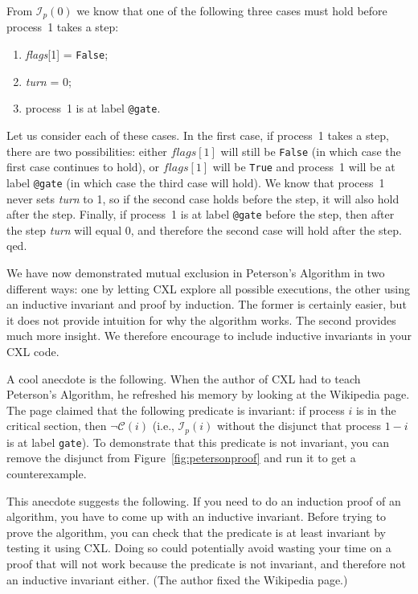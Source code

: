 \documentclass{report}
\begin{document}
From $\mathcal{I}_p(0)$ we know that one of the following three cases must hold before
process~1 takes a step:
\begin{enumerate}
\item \textit{flags}[1] = \texttt{False};
\item \textit{turn} = 0;
\item process~1 is at label \texttt{@gate}.
\end{enumerate}

Let us consider each of these cases.
In the first case, if process~1 takes a step, there are two possibilities:
either $flags[1]$ will still be \texttt{False} (in which case the first case
continues to hold), or $flags[1]$ will be \texttt{True}
and process~1 will be at label \texttt{@gate} (in which case the third case
will hold).
We know that process~1 never sets \textit{turn} to 1, so
if the second case holds before the step, it will also hold after the step.
Finally, if process~1 is at label \texttt{@gate} before the step, then after
the step \textit{turn} will equal 0, and therefore the second case will hold
after the step.  qed.

We have now demonstrated mutual exclusion in Peterson's Algorithm in two
different ways: one by letting CXL explore all possible executions, the
other using an inductive invariant and proof by induction.  The former
is certainly easier, but it does not provide intuition for why the
algorithm works.  The second provides much more insight.  We therefore
encourage to include inductive invariants in your CXL code.

A cool anecdote is the following.  When the author of CXL had to teach
Peterson's Algorithm, he refreshed his memory by looking at the Wikipedia
page.  The page claimed that the following predicate is invariant:
if process $i$ is in the critical section, then $\lnot \mathcal{C}(i)$ (i.e.,
$\mathcal{I}_p(i)$ without the disjunct that process $1-i$ is at label \texttt{gate}).
To demonstrate that this predicate is not invariant, you can remove the
disjunct from Figure~\ref{fig:petersonproof} and run it to get a
counterexample.

This anecdote suggests the following.  If you need to do an induction
proof of an algorithm, you have to come up with an inductive invariant.
Before trying to prove the algorithm, you can check that the predicate is
at least invariant by testing it using CXL.  Doing so could potentially
avoid wasting your time on a proof that will not work because the
predicate is not invariant, and therefore not an inductive invariant either.
(The author fixed the Wikipedia page.)
\end{document}
